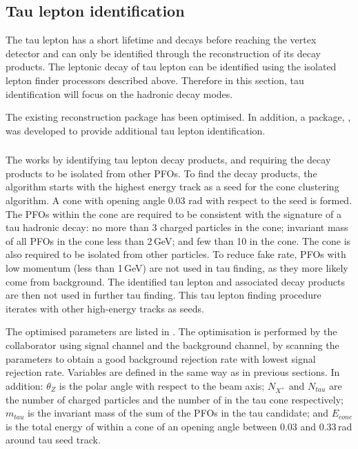 \subsection{Tau lepton identification}

The tau lepton has a short lifetime and decays before reaching the vertex detector and  can only be identified through the reconstruction of its decay products. The leptonic decay of tau lepton can be identified using the isolated lepton finder processors described above. Therefore in this section, tau identification will focus on the hadronic decay modes.

The existing \TauFinderProcessor  \cite{LCD-Note-2010-009} reconstruction package has been optimised. In addition, a package, \BonoTauFinder, was developed to provide additional tau lepton identification.




\subsubsection{\TauFinderProcessor}

The \TauFinderProcessor works by identifying tau lepton decay products, and requiring the decay products to be isolated from other PFOs. To find the decay products, the algorithm starts with the highest energy track as a seed for the cone clustering algorithm. A cone with opening angle 0.03 rad with respect to the seed is formed. The PFOs within the cone are required to be consistent with the signature of a tau hadronic decay: no more than 3 charged particles in the cone; invariant mass of all PFOs in the cone less than 2\,GeV; and few than 10 \PFOs in the cone. The cone is also required to be isolated from other particles. To reduce fake rate, PFOs with low momentum (less than 1\,GeV) are not used  in tau finding, as they more likely come from \ggHad background. The identified tau lepton and associated decay products are then not used in further tau finding. This tau lepton finding procedure iterates with other high-energy tracks as seeds.


The optimised parameters are listed in . The optimisation is performed by the collaborator using \eeToHHbbbb signal channel and the \eeTo{ \Pquark \Pquark \Pquark \Pquark \Plepton \Pnu} background channel, by scanning the parameters to obtain a good background rejection rate with lowest signal rejection rate.  Variables are defined in the same way as in previous sections. In addition: $\theta_Z$ is the polar angle with respect to the beam axis; $N_{X^+}$ and $N_{tau}$ are the number of charged particles and the number of \PFOs  in the tau cone respectively; $m_{tau}$ is the invariant mass of the sum of the PFOs in the tau candidate; and $E_{cone}$ is the total energy of \PFOs within a cone of an opening angle between 0.03 and 0.33\,rad  around tau seed track.

